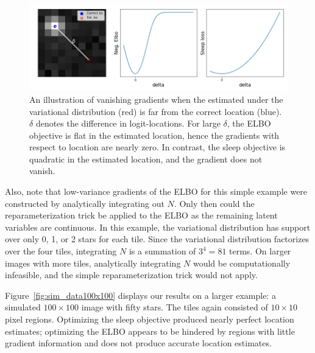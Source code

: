 \begin{figure}[!htb]
    \centering
    \includegraphics[width=\textwidth]{figures/gradzero_cartoon3.png}
    \caption{An illustration of vanishing gradients when the estimated under the variational distribution (red) is far from the correct location (blue). 
    $\delta$ denotes the difference in logit-locations. 
    For large $\delta$, the ELBO objective is flat in the estimated location, hence the gradients with respect to location are nearly zero.
    In contrast, the sleep objective is quadratic in the estimated location, and the gradient does not vanish. }
    \label{fig:gradzero_cartoon}
\end{figure}

Also, note that low-variance gradients of the ELBO for this simple example were constructed by analytically integrating out $N$. Only then could the reparameterization trick be applied to the ELBO as the remaining latent variables are continuous. 
In this example, the variational distribution has support over only 0, 1, or 2 stars for each tile. 
Since the variational distribution factorizes over the four tiles, integrating $N$ is a summation of $3^4 = 81$ terms.
On larger images with more tiles, analytically integrating $N$ would be computationally infeasible, 
and the simple reparameterization trick would not apply. 

Figure~\ref{fig:sim_data100x100} displays our results on a larger example: a simulated $100\times 100$ image with fifty stars. 
The tiles again consisted of $10\times 10$ pixel regions. 
Optimizing the sleep objective produced nearly perfect location estimates; 
optimizing the ELBO appears to be hindered by regions with little gradient information and does not produce accurate location estimates. 

